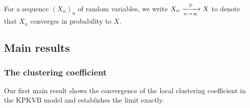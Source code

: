 For a sequence $(X_n)_n$ of random variables, we write $X_n \xrightarrow[n\to\infty]{\mathbb{P}} X$ to denote that $X_n$ converges in 
probability to $X$. %



\subsection{Main results}\label{ssec:main_results}

\subsubsection{The clustering coefficient}

Our first main result shows the convergence of the local clustering coefficient in the KPKVB model and 
establishes the limit exactly.

